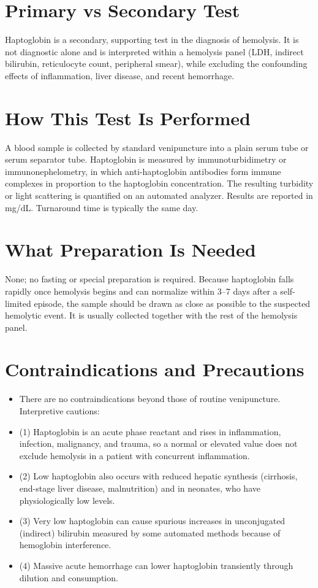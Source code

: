 \section*{Primary vs Secondary Test}
Haptoglobin is a secondary, supporting test in the diagnosis of hemolysis. It is not diagnostic alone and is interpreted within a hemolysis panel (LDH, indirect bilirubin, reticulocyte count, peripheral smear), while excluding the confounding effects of inflammation, liver disease, and recent hemorrhage.
\section*{How This Test Is Performed}
A blood sample is collected by standard venipuncture into a plain serum tube or serum separator tube. Haptoglobin is measured by immunoturbidimetry or immunonephelometry, in which anti-haptoglobin antibodies form immune complexes in proportion to the haptoglobin concentration. The resulting turbidity or light scattering is quantified on an automated analyzer. Results are reported in mg/dL. Turnaround time is typically the same day.
\section*{What Preparation Is Needed}
None; no fasting or special preparation is required. Because haptoglobin falls rapidly once hemolysis begins and can normalize within 3--7 days after a self-limited episode, the sample should be drawn as close as possible to the suspected hemolytic event. It is usually collected together with the rest of the hemolysis panel.
\section*{Contraindications and Precautions}
\begin{itemize}
  \item There are no contraindications beyond those of routine venipuncture. Interpretive cautions:
  \item (1) Haptoglobin is an acute phase reactant and rises in inflammation, infection, malignancy, and trauma, so a normal or elevated value does not exclude hemolysis in a patient with concurrent inflammation.
  \item (2) Low haptoglobin also occurs with reduced hepatic synthesis (cirrhosis, end-stage liver disease, malnutrition) and in neonates, who have physiologically low levels.
  \item (3) Very low haptoglobin can cause spurious increases in unconjugated (indirect) bilirubin measured by some automated methods because of hemoglobin interference.
  \item (4) Massive acute hemorrhage can lower haptoglobin transiently through dilution and consumption.
\end{itemize}
